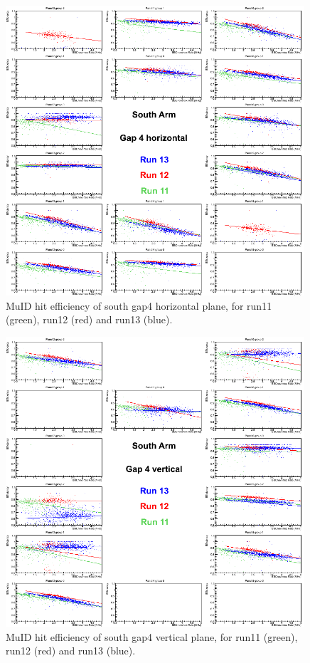 \clearpage
\begin{center}
  \begin{figure}[p]
    \includegraphics[width=0.99\textwidth]{./figures/efficomp_South_gap4_horizontal.png}
    \caption{\label{Fig:efficiency:MuIdEff:a0g4p0}MuID hit efficiency of south gap4 horizontal plane, for run11 (green), run12 (red) and run13 (blue).}
  \end{figure}
\end{center}
\begin{center}
  \begin{figure}[p]
    \includegraphics[width=0.99\textwidth]{./figures/efficomp_South_gap4_vertical.png}
    \caption{\label{Fig:efficiency:MuIdEff:a0g4p1}MuID hit efficiency of south gap4 vertical plane, for run11 (green), run12 (red) and run13 (blue).}
  \end{figure}
\end{center}
